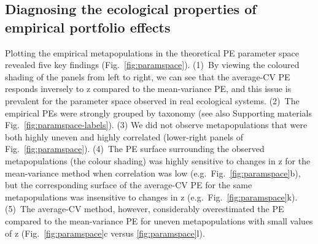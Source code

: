 \subsection{Diagnosing the ecological properties of empirical portfolio effects}

Plotting the empirical metapopulations in the theoretical PE parameter space
revealed five key findings (Fig.~\ref{fig:paramspace}).
(1)~By viewing the coloured shading of the panels from left to right, we
can see that the average-CV PE responds inversely to z compared to the
mean-variance PE, and this issue is prevalent for the parameter space observed
in real ecological systems.
(2)~The empirical PEs were strongly grouped by taxonomy (see also
Supporting materials Fig.~\ref{fig:paramspace-labels}).
(3)
We did not observe metapopulations that were both highly
uneven and highly correlated (lower-right panels of Fig.~\ref{fig:paramspace}).
(4)~The PE surface surrounding the observed metapopulations (the colour
shading) was highly sensitive to changes in z for the mean-variance method when
correlation was low (e.g.\ Fig.~\ref{fig:paramspace}b), but the corresponding
surface of the average-CV PE for the same metapopulations was insensitive to
changes in z (e.g.\ Fig.~\ref{fig:paramspace}k).
(5)~The average-CV method,
however, considerably overestimated the PE compared to the mean-variance PE for
uneven metapopulations with small values of z (Fig.~\ref{fig:paramspace}c
versus \ref{fig:paramspace}l).

